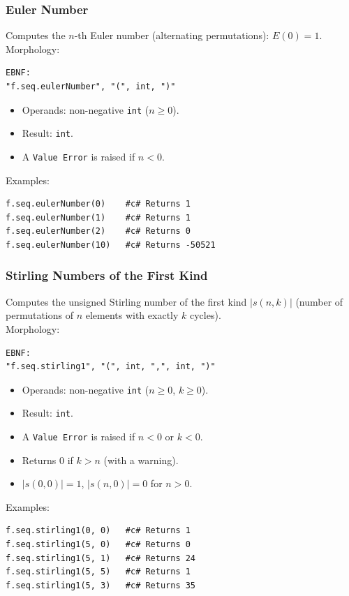 \subsubsection{Euler Number}
Computes the $n$-th Euler number (alternating permutations): $E(0) = 1$.\\
Morphology:
\begin{verbatim}
EBNF:
"f.seq.eulerNumber", "(", int, ")"
\end{verbatim}
\begin{itemize}
\item Operands: non-negative \texttt{int} ($n \geq 0$).
\item Result: \texttt{int}.
\item A \texttt{Value Error} is raised if $n < 0$.
\end{itemize}
Examples:
\begin{verbatim}
f.seq.eulerNumber(0)    #c# Returns 1
f.seq.eulerNumber(1)    #c# Returns 1
f.seq.eulerNumber(2)    #c# Returns 0
f.seq.eulerNumber(10)   #c# Returns -50521
\end{verbatim}

\subsubsection{Stirling Numbers of the First Kind}
Computes the unsigned Stirling number of the first kind $|s(n,k)|$ (number of permutations of $n$ elements with exactly $k$ cycles).\\
Morphology:
\begin{verbatim}
EBNF:
"f.seq.stirling1", "(", int, ",", int, ")"
\end{verbatim}
\begin{itemize}
\item Operands: non-negative \texttt{int} ($n \geq 0$, $k \geq 0$).
\item Result: \texttt{int}.
\item A \texttt{Value Error} is raised if $n < 0$ or $k < 0$.
\item Returns 0 if $k > n$ (with a warning).
\item $|s(0,0)| = 1$, $|s(n,0)| = 0$ for $n > 0$.
\end{itemize}
Examples:
\begin{verbatim}
f.seq.stirling1(0, 0)   #c# Returns 1
f.seq.stirling1(5, 0)   #c# Returns 0
f.seq.stirling1(5, 1)   #c# Returns 24
f.seq.stirling1(5, 5)   #c# Returns 1
f.seq.stirling1(5, 3)   #c# Returns 35
\end{verbatim}

